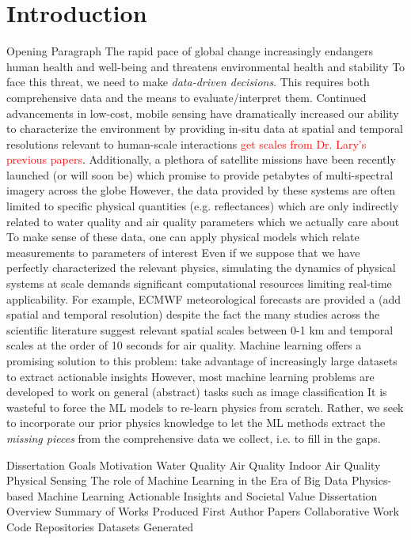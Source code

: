 \documentclass{article}
\begin{document}
\section{Introduction}
\begin{outline}[enumerate]
  \1 Opening Paragraph
      \2 The rapid pace of global change increasingly endangers human health and
      well-being
      and threatens environmental health and stability
      \2 To face this threat, we need to make \textit{data-driven decisions}.
      This requires both comprehensive data and the means to evaluate/interpret
      them.
      \2 Continued advancements in low-cost, mobile sensing have dramatically
      increased our ability to characterize the environment by providing in-situ
      data at spatial and temporal resolutions relevant to human-scale
      interactions \textcolor{red}{get scales from Dr. Lary's previous papers}.
      \2 Additionally, a plethora of satellite missions have been recently
      launched (or will soon be) which promise to provide petabytes of
      multi-spectral imagery across the globe
      \2 However, the data provided by these systems are often limited to specific
      physical quantities (e.g. reflectances) which are only indirectly related
      to water quality and air quality parameters which we actually care about
      \2 To make sense of these data, one can apply physical models which relate
      measurements to parameters of interest
      \2 Even if we suppose that we have perfectly characterized the relevant
      physics, simulating the dynamics of physical systems at scale
      demands significant computational resources limiting real-time
      applicability.
      \2 For example, ECMWF meteorological forecasts are provided a (add spatial
      and temporal resolution) despite the fact the many studies across the
      scientific literature suggest relevant spatial scales between 0-1 km and
      temporal scales at the order of 10 seconds for air quality.
      \2 Machine learning offers a promising solution to this problem: take
      advantage of increasingly large datasets to extract actionable insights
      \2 However, most machine learning problems are developed to work on
      general (abstract) tasks such as image classification
      \2 It is wasteful to force the ML models to re-learn physics from scratch.
      Rather, we seek to incorporate our prior physics knowledge to let the ML
      methods extract the \textit{missing pieces} from the comprehensive data we
      collect, i.e. to fill in the gaps.

  \1 Dissertation Goals
  \1 Motivation
      \2 Water Quality
      \2 Air Quality
      \2 Indoor Air Quality
  \1 Physical Sensing
  \1 The role of Machine Learning in the Era of Big Data
  \1 Physics-based Machine Learning
  \1 Actionable Insights and Societal Value
  \1 Dissertation Overview
  \1 Summary of Works Produced
      \2 First Author Papers
      \2 Collaborative Work
      \2 Code Repositories
      \2 Datasets Generated
\end{outline}
\end{document}
